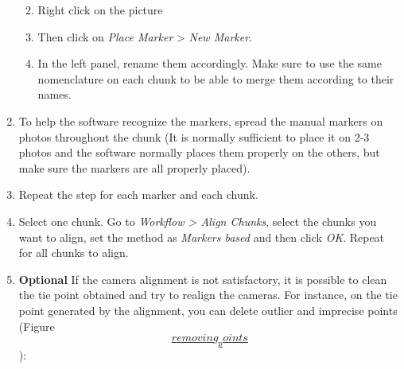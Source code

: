 \documentclass[
]{book}
\begin{document}
\begin{enumerate}
  \begin{enumerate}
  \def\labelenumii{\arabic{enumii}.}
  \item
    Right click on the picture
  \item
    Then click on \emph{Place Marker} \textgreater{} \emph{New Marker}.
  \item
    In the left panel, rename them accordingly. Make sure to use the
    same nomenclature on each chunk to be able to merge them
    according to their names.
  \end{enumerate}
\item
  To help the software recognize the markers, spread the manual
  markers on photos throughout the chunk (It is normally sufficient to
  place it on 2-3 photos and the software normally places them
  properly on the others, but make sure the markers are all properly
  placed).
\item
  Repeat the step for each marker and each chunk.
\item
  Select one chunk. Go to \emph{Workflow \textgreater{} Align Chunks}, select the
  chunks you want to align, set the method as \emph{Markers based} and then
  click \emph{OK}. Repeat for all chunks to align.
\item
  \textbf{Optional} If the camera alignment is not satisfactory, it is
  possible to clean the tie point obtained and try to realign the
  cameras. For instance, on the tie point generated by the alignment,
  you can delete outlier and imprecise points (Figure
  \protect\hyperlink{removing_points}{\[removing_points\]}):


\end{enumerate}
\end{document}
